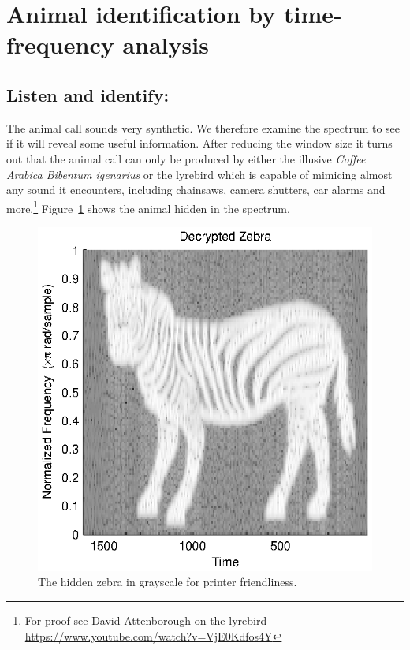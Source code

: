 \section{Animal identification by time-frequency analysis}
\subsection{Listen and identify:}
The animal call sounds very synthetic. We therefore examine the spectrum to see if it 
will reveal some useful information. After reducing the window size it turns out that
the animal call can only be produced by either the illusive \emph{Coffee Arabica Bibentum igenarius}
or the lyrebird which is capable of mimicing almost any sound it encounters, including chainsaws,
camera shutters, car alarms and more.\footnote{For proof see David Attenborough on the lyrebird \url{https://www.youtube.com/watch?v=VjE0Kdfos4Y}}
Figure~\ref{fig:zebra} shows the animal hidden in the spectrum.
\begin{figure}
	\center
	\includegraphics{./picture/zebra.eps}
	\caption{The hidden zebra in grayscale for printer friendliness.}
	\label{fig:zebra}
\end{figure}

